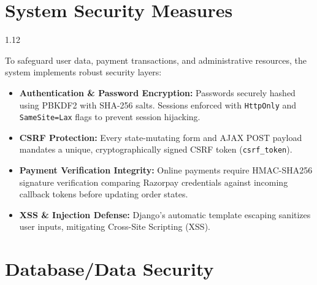 \documentclass[12pt,a4paper]{article}
\begin{document}
\section{System Security Measures}

\vspace{0.06in}

{\fontsize{12.5}{17}\selectfont
\begin{spacing}{1.12}

\noindent
To safeguard user data, payment transactions, and administrative resources, the system implements robust security layers:
\begin{itemize}
    \setlength{\itemsep}{1.5pt}
    \item \textbf{Authentication \& Password Encryption:} Passwords securely hashed using PBKDF2 with SHA-256 salts. Sessions enforced with \texttt{HttpOnly} and \texttt{SameSite=Lax} flags to prevent session hijacking.
    \item \textbf{CSRF Protection:} Every state-mutating form and AJAX POST payload mandates a unique, cryptographically signed CSRF token (\texttt{csrf\_token}).
    \item \textbf{Payment Verification Integrity:} Online payments require HMAC-SHA256 signature verification comparing Razorpay credentials against incoming callback tokens before updating order states.
    \item \textbf{XSS \& Injection Defense:} Django's automatic template escaping sanitizes user inputs, mitigating Cross-Site Scripting (XSS).
\end{itemize}

\end{spacing}
}

\vspace{0.1in}




\section{Database/Data Security}

\vspace{0.06in}
\end{document}
